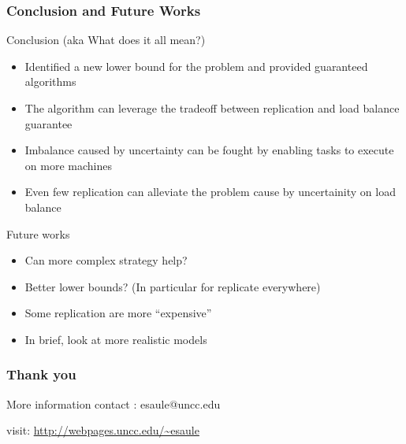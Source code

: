 \documentclass[usenames,dvipsnames]{beamer}
\begin{document}
\begin{frame}
  \frametitle{Conclusion and Future Works}

  \begin{block}{Conclusion (aka What does it all mean?)}
    \begin{itemize}
    \item Identified a new lower bound for the problem and provided guaranteed algorithms
    \item The algorithm can leverage the tradeoff between replication and load balance guarantee
    \item Imbalance caused by uncertainty can be fought by enabling tasks to execute on more machines
    \item Even few replication can alleviate the problem cause by uncertainity on load balance 
    \end{itemize}
  \end{block}

  \pause

  \begin{block}{Future works}
    \begin{itemize}
    \item Can more complex strategy help?
    \item Better lower bounds? (In particular for replicate everywhere)
    \item Some replication are more ``expensive''
    \item In brief, look at more realistic models
    \end{itemize}
  \end{block}
\end{frame}



\begin{frame}
  \frametitle{Thank you}

    \begin{block}{More information}
    contact : esaule@uncc.edu
    
    visit: \url{http://webpages.uncc.edu/~esaule}
  \end{block}

\end{frame}
\end{document}
